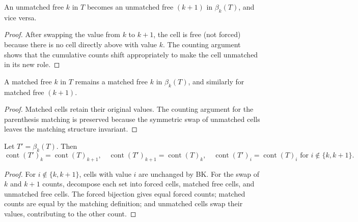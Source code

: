 \begin{lemma}
\label{lem.sf.bk-unmatched-becomes-unmatched}
\leanhelper
\leanok
An unmatched free $k$ in $T$ becomes an unmatched free $(k{+}1)$ in
$\beta_k(T)$, and vice versa.
\end{lemma}

\begin{proof}
\leanok
After swapping the value from $k$ to $k{+}1$, the cell is free (not forced)
because there is no cell directly above with value $k$. The counting argument
shows that the cumulative counts shift appropriately to make the cell unmatched
in its new role.
\end{proof}

\begin{lemma}
\label{lem.sf.bk-matched-stays-matched}
\leanhelper
\leanok
A matched free $k$ in $T$ remains a matched free $k$ in $\beta_k(T)$,
and similarly for matched free $(k{+}1)$.
\end{lemma}

\begin{proof}
\leanok
Matched cells retain their original values. The counting argument for the
parenthesis matching is preserved because the symmetric swap of unmatched
cells leaves the matching structure invariant.
\end{proof}

\begin{lemma}
\label{lem.sf.bk-content-swap-lr}
\leanhelper
\leanok
Let $T' = \beta_k(T)$. Then
\[
  \operatorname{cont}(T')_k = \operatorname{cont}(T)_{k+1},
  \quad
  \operatorname{cont}(T')_{k+1} = \operatorname{cont}(T)_k,
  \quad
  \operatorname{cont}(T')_i = \operatorname{cont}(T)_i
  \text{ for } i \notin \{k, k{+}1\}.
\]
\end{lemma}

\begin{proof}
\leanok
For $i \notin \{k, k{+}1\}$, cells with value $i$ are unchanged by BK.
For the swap of $k$ and $k{+}1$ counts, decompose each set into forced cells,
matched free cells, and unmatched free cells. The forced bijection gives
equal forced counts; matched counts are equal by the matching definition;
and unmatched cells swap their values, contributing to the other count.
\end{proof}

